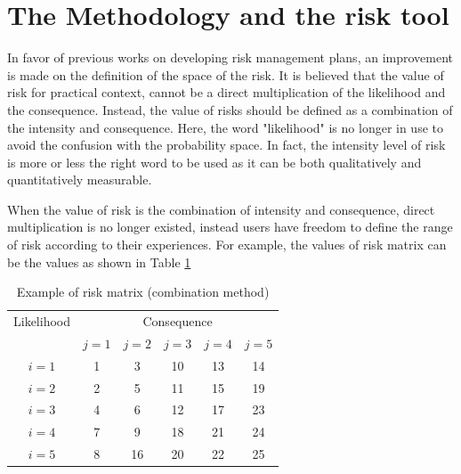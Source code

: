 \documentclass[10pt,halfline,a4paper]{ouparticle}
\begin{document}
\section{The Methodology and the risk tool}
\label{sec3}
In favor of previous works on developing risk management plans, an improvement is made on the definition of the space of the risk. It is believed that the value of risk for practical context, cannot be a direct multiplication of the likelihood and the consequence. Instead, the value of risks should be defined as a combination of the intensity and consequence. Here, the word "likelihood" is no longer in use to avoid the confusion with the probability space. In fact, the intensity level of risk is more or less the right word to be used as it can be both qualitatively and quantitatively measurable.

When the value of risk is the combination of intensity and consequence, direct multiplication is no longer existed, instead users have freedom to define the range of risk according to their experiences. For example, the values of risk matrix can be the values as shown in Table \ref{tbl_riskmatrix2}

\begin{table}
	\centering
	\caption{Example of risk matrix (combination method)} 
	\begin{tabular}{l|l|l|l|l|l}
		\hline
		\multicolumn{1}{c|}{Likelihood} & \multicolumn{5}{c}{Consequence} \\ 
		\cline{2-6}
		\multicolumn{1}{c|}{} & \multicolumn{1}{c|}{$j=1$} & \multicolumn{1}{c|}{$j=2$} & \multicolumn{1}{c|}{$j=3$} & \multicolumn{1}{c|}{$j=4$} & \multicolumn{1}{c}{$j=5$} \\ 
		\hline
		\multicolumn{1}{c|}{$i=1$} & \multicolumn{1}{c|}{1} & \multicolumn{1}{c|}{3} & \multicolumn{1}{c|}{10} & \multicolumn{1}{c|}{13} & \multicolumn{1}{c}{14} \\ 
		\multicolumn{1}{c|}{$i=2$} & \multicolumn{1}{c|}{2} & \multicolumn{1}{c|}{5} & \multicolumn{1}{c|}{11} & \multicolumn{1}{c|}{15} & \multicolumn{1}{c}{19} \\ 
		\multicolumn{1}{c|}{$i=3$} & \multicolumn{1}{c|}{4} & \multicolumn{1}{c|}{6} & \multicolumn{1}{c|}{12} & \multicolumn{1}{c|}{17} & \multicolumn{1}{c}{23} \\ 
		\multicolumn{1}{c|}{$i=4$} & \multicolumn{1}{c|}{7} & \multicolumn{1}{c|}{9} & \multicolumn{1}{c|}{18} & \multicolumn{1}{c|}{21} & \multicolumn{1}{c}{24} \\ 
		\multicolumn{1}{c|}{$i=5$} & \multicolumn{1}{c|}{8} & \multicolumn{1}{c|}{16} & \multicolumn{1}{c|}{20} & \multicolumn{1}{c|}{22} & \multicolumn{1}{c}{25} \\ 
		\hline
	\end{tabular}
	\label{tbl_riskmatrix2}
\end{table}
\end{document}
